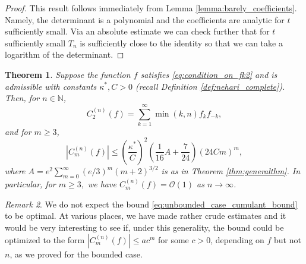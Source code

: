 \documentclass[11pt]{amsart}
\theoremstyle{plain}
\newtheorem{theorem}{Theorem}[section]
\theoremstyle{remark}
\newtheorem{remark}[theorem]{Remark}
\numberwithin{equation}{section}
\begin{document}
\begin{proof}
This result follows immediately from Lemma \ref{lemma:barely_coefficients}. 
Namely, the determinant is a polynomial and the coefficients are analytic for $t$ sufficiently small. Via an absolute estimate we can check further that for $t$ sufficiently small $T_n$ is sufficiently close to the identity so that we can take a logarithm of the determinant.
\end{proof}

    
    \begin{theorem}\label{thm:unbounded_cumulants}
Suppose the function $f$ satisfies \eqref{eq:condition_on_fk2} and is admissible with constants $\kappa^*, C>0$ (recall Definition \ref{def:nehari_complete}). Then, for $n \in \mathbb N$,
 \begin{equation}
        C_2^{(n)}(f)= \sum_{k=1}^\infty \min (k,n) f_kf_{-k},
    \end{equation}
    and for $m\geq 3$,
   \begin{equation}\label{eq:unbounded_case_cumulant_bound}
        \left|C_m^{(n)}(f)\right|\leq 
        \left(\frac{\kappa^*}{C}\right)^2 \left(\frac{1}{16}A +\frac{7}{24}
\right)\left(24Cm\right)^{m},
    \end{equation}
    where $A=e^2\sum_{m=0}^{\infty} (e/3)^m (m+2)^{3/2}$ is as in Theorem \ref{thm:generalthm}.
    In particular, for $m\geq 3,$ we have $ C_m^{(n)}(f)=\mathcal O(1)$  as $n \to \infty$.
\end{theorem}
\begin{remark}
    We do not expect the bound \eqref{eq:unbounded_case_cumulant_bound} to be optimal. At various places, we have made rather crude estimates and it would be very interesting to see if, under this generality, the bound could be optimized to the form $\left|C_m^{(n)}(f)\right|\leq a c^m$ for some $c>0$, depending on $f$ but not $n$, as we proved for the bounded case.
\end{remark}
\end{document}
